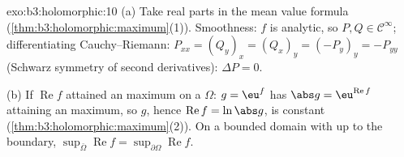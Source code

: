\begin{solution}{exo:b3:holomorphic:10}
(a) Take real parts in the mean value formula
(\cref{thm:b3:holomorphic:maximum}(1)). Smoothness: $f$ is
analytic, so $P, Q \in \mathcal C^\infty$; differentiating
Cauchy--Riemann: $P_{xx} = (Q_y)_x = (Q_x)_y = (-P_y)_y =
-P_{yy}$ (Schwarz symmetry of second derivatives): $\Delta P =
0$.

(b) If $\operatorname{Re}f$ attained an  maximum on a
 $\Omega$: $g = \eu^f$ has $\abs g =
\eu^{\operatorname{Re}f}$ attaining an  maximum, so
$g$, hence $\operatorname{Re}f = \ln\abs g$, is constant
(\cref{thm:b3:holomorphic:maximum}(2)). On a bounded domain
with  up to the boundary,
$\sup_{\bar\Omega}\operatorname{Re}f =
\sup_{\partial\Omega}\operatorname{Re}f$.
\end{solution}

